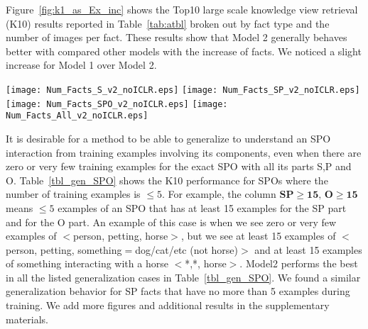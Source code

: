 \documentclass[runningheads]{llncs}
\begin{document}
Figure~\ref{fig:k1_as_Ex_inc} shows the Top10 large scale knowledge view retrieval (K10) results reported in Table~\ref{tab:atbl} broken out by fact type  and the number of images per fact. These results show that Model 2 generally behaves better with compared other models with the increase of facts. We noticed a slight increase for Model 1 over Model 2. 
\begin{figure*}[t!]
  \texttt{[image: Num\_Facts\_S\_v2\_noICLR.eps]} 
        \texttt{[image: Num\_Facts\_SP\_v2\_noICLR.eps]}
       \texttt{[image: Num\_Facts\_SPO\_v2\_noICLR.eps]}
             \texttt{[image: Num\_Facts\_All\_v2\_noICLR.eps]}
        \caption{K10 Performance ($y$-axis) versus the number of images per fact ($x$-axis). Top Left: Objects (S), Top Right: Attributed Objects and Objects performing Actions (SP), Bottom Left: Interactions (SPO), Bottom Right: All Facts.}
        \label{fig:k1_as_Ex_inc}
          \vspace{-5mm}
\end{figure*}%
It is desirable for a method to be able to generalize to understand an SPO interaction from training examples involving its components, even when there are zero or very few training examples for the exact SPO  with all its parts S,P and O. Table~\ref{tbl_gen_SPO} shows the K10 performance for SPOs where the number of training examples is $\le 5$. 
For example, the column $\textbf{SP$\ge$15, O$\ge$15}$  means $\le 5$ examples of an SPO that has at least 15 examples for the SP part and for the O part. An example of this case is when we see zero or very few examples of $<$person, petting, horse$>$, but we see at least 15 examples of $<$person, petting, something$=$dog/cat/etc (not horse)$>$ and at least 15 examples of something interacting with a horse $<$*,*, horse$>$. Model2  performs the best in all the listed generalization cases in   Table~\ref{tbl_gen_SPO}. 
We found a similar generalization behavior for SP facts that have no more than 5 examples during training. We add more figures and additional results in the supplementary materials. 
\end{document}
